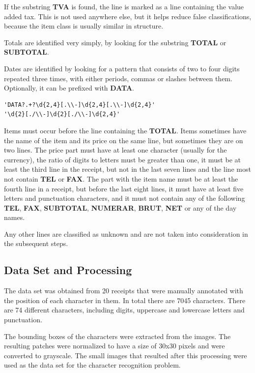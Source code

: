 If the substring \textbf{TVA} is found, the line is marked as a line containing the value added tax. This is not used anywhere else, but it helps reduce false classifications, because the item class is usually similar in structure. 

Totals are identified very simply, by looking for the substring \textbf{TOTAL} or \textbf{SUBTOTAL}.

Dates are identified by looking for a pattern that consists of two to four digits repeated three times, with either periods, commas or slashes between them. Optionally, it can be prefixed with \textbf{DATA}.

\begin{lstlisting}
'DATA?.+?\d{2,4}[.\\-]\d{2,4}[.\\-]\d{2,4}'
'\d{2}[./\\-]\d{2}[./\\-]\d{2,4}'
\end{lstlisting}

Items must occur before the line containing the \textbf{TOTAL}. Items sometimes have the name of the item and its price on the same line, but sometimes they are on two lines. The price part must have at least one character (usually for the currency), the ratio of digits to letters must be greater than one, it must be at least the third line in the receipt, but not in the last seven lines and the line most not contain \textbf{TEL} or \textbf{FAX}. The part with the item name must be at least the fourth line in a receipt, but before the last eight lines, it must have at least five letters and punctuation characters, and it must not contain any of the following \textbf{TEL}, \textbf{FAX}, \textbf{SUBTOTAL}, \textbf{NUMERAR}, \textbf{BRUT}, \textbf{NET} or any of the day names. 

Any other lines are classified as unknown and are not taken into consideration in the subsequent steps.   

\subsection{Data Set and Processing}
The data set was obtained from 20 receipts that were manually annotated with the position of each character in them. In total there are 7045 characters. There are 74 different characters, including digits, uppercase and lowercase letters and punctuation. 

The bounding boxes of the characters were extracted from the images. The resulting patches were normalized to have a size of 30x30 pixels and were converted to grayscale. The small images that resulted after this processing were used as the data set for the character recognition problem.

